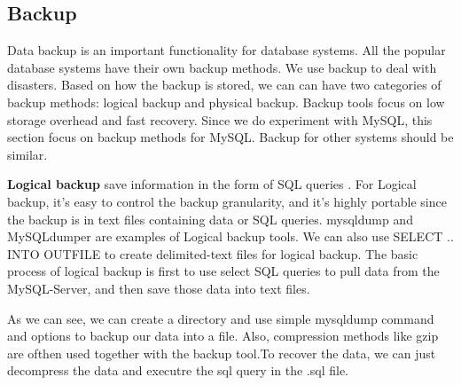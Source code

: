 \subsection{Backup}

Data backup is an important functionality for database systems. All the popular database systems have their own backup methods. We use backup to deal with disasters. Based on how the backup is stored, we can can have two categories of backup methods: logical backup and physical backup. Backup tools focus on low storage overhead and fast recovery. Since we do experiment with MySQL, this section focus on backup methods for MySQL. Backup for other systems should be similar.


\textbf{Logical backup} save information in the form of SQL queries \citep{mysqlbackupdocumentation}.  For Logical backup, it's easy to control the backup granularity, and it's highly portable since the backup is in text files containing data or SQL queries. mysqldump \citep{mysqldump-doc} and MySQLdumper\citep{mysqldumpper} are examples of Logical backup tools. We can also use SELECT .. INTO OUTFILE to create delimited-text files for logical backup. The basic process of logical backup is first to use select SQL queries to pull data from the MySQL-Server, and then save those data into text files.






As we can see, we can create a directory and use simple mysqldump command and options to backup our data into a file. Also, compression methods like gzip are ofthen used together with the backup tool.To recover the data, we can just decompress the data and executre the sql query in the .sql file. 


